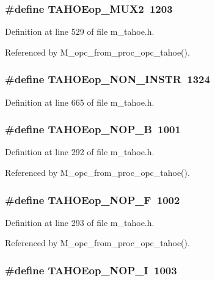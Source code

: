 \subsubsection{\setlength{\rightskip}{0pt plus 5cm}\#define TAHOEop\_\-MUX2~1203}\label{m__tahoe_8h_2f4df018a20e2f356e6ec49ebc208bf1}




Definition at line 529 of file m\_\-tahoe.h.

Referenced by M\_\-opc\_\-from\_\-proc\_\-opc\_\-tahoe().
\subsubsection{\setlength{\rightskip}{0pt plus 5cm}\#define TAHOEop\_\-NON\_\-INSTR~1324}\label{m__tahoe_8h_671a3563316e2d63ca08fda6b9174cce}




Definition at line 665 of file m\_\-tahoe.h.
\subsubsection{\setlength{\rightskip}{0pt plus 5cm}\#define TAHOEop\_\-NOP\_\-B~1001}\label{m__tahoe_8h_142788026fea703eace343294cdf252a}




Definition at line 292 of file m\_\-tahoe.h.

Referenced by M\_\-opc\_\-from\_\-proc\_\-opc\_\-tahoe().
\subsubsection{\setlength{\rightskip}{0pt plus 5cm}\#define TAHOEop\_\-NOP\_\-F~1002}\label{m__tahoe_8h_7107555c42e3a7d14c15c52df859a043}




Definition at line 293 of file m\_\-tahoe.h.

Referenced by M\_\-opc\_\-from\_\-proc\_\-opc\_\-tahoe().
\subsubsection{\setlength{\rightskip}{0pt plus 5cm}\#define TAHOEop\_\-NOP\_\-I~1003}\label{m__tahoe_8h_d33d049740d0b99aff0c5b9fb540e1af}




